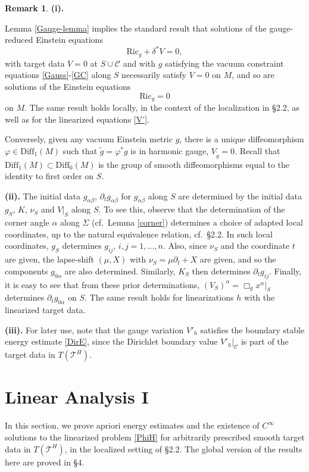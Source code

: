 \documentclass[10pt]{amsart}
\renewcommand{\a}{\alpha}
\renewcommand{\b}{\beta}
\renewcommand{\d}{\delta}
\newcommand{\f}{\varphi}
\newcommand{\Si}{\Sigma}
\newcommand{\cC}{{\mathcal C}}
\newcommand{\cT}{{\mathcal T}}
\newcommand{\Diff}{\mathrm{Diff}}
\newcommand{\Ric}{\mathrm{Ric}}
\newcommand{\p}{\partial}
\newcommand{\<}{\langle}
\renewcommand{\>}{\rangle}
\newcommand{\w}{\widetilde}
\theoremstyle{plain}
\theoremstyle{remark}
\theoremstyle{definition}
\newtheorem{remark}[lemma]{Remark}
\numberwithin{equation}{section}
\begin{document}
\begin{remark} \label{gaugerem} 
{\bf (i).}
{\rm Lemma \ref{Gauge-lemma} implies the standard result that solutions of the gauge-reduced Einstein equations 
$$\Ric_g + \d^*V = 0,$$
with target data $ V = 0$ at $S\cup \cC$ and with $g$ satisfying the vacuum constraint equations \eqref{Gauss}-\eqref{GC} along $S$ necessarily satisfy 
$V = 0$ on $M$, and so are solutions of the Einstein equations 
$$\Ric_g = 0$$
on $M$. The same result holds locally, in the context of the localization in \S 2.2, as well as for the linearized equations \eqref{V'}. 

  Conversely, given any vacuum Einstein metric $g$, there is a unique diffeomorphism $\f \in \Diff_1(M)$ such that $\w g = \f^*g$ is in 
harmonic gauge, $V_{\w g} = 0$. Recall that $\Diff_1(M) \subset \Diff_0(M)$ is the group of smooth diffeomorphisms equal to the identity to 
first order on $S$. 
 
{\bf (ii).} The initial data $g_{\a\b}$, $\p_t g_{\a\b}$ for $g_{\a\b}$ along $S$ are determined by the initial data $g_S$, $K$, $\nu_S$ and $V|_S$ 
along $S$. To see this, observe that the determination of the corner angle $\a$ along $\Si$ (cf.~Lemma \ref{corner}) determines a choice of adapted 
local coordinates, up to the natural equivalence relation, cf.~\S 2.2. In such local coordinates, $g_S$ determines $g_{ij}$, $i, j = 1,\dots, n$. Also, since 
$\nu_S$ and the coordinate $t$ are given, the lapse-shift $(\mu, X)$ with $\nu_S = \mu \p_t + X$ are given, and so the components $g_{0\a}$ are also determined. 
Similarly, $K_S$ then determines $\p_t g_{ij}$. Finally, it is easy to see that from these prior determinations, $(V_S)^{\a} = \Box_g x^{\a}|_S$ determines 
$\p_t g_{0\a}$ on $S$. The same result holds for linearizations $h$ with the linearized target data. 

{\bf (iii).} For later use, note that the gauge variation $V'_h$ satisfies the boundary stable energy estimate \eqref{DirE}, since the Dirichlet boundary 
value $V'_h |_{\cC}$ is part of the target data in $T(\cT^H)$. 

}
\end{remark}
  

  
 \section{Linear Analysis I}
  
  In this section, we prove apriori energy estimates and the existence of $C^{\infty}$ solutions to the linearized problem \eqref{PhiH} for arbitrarily prescribed 
smooth target data in $T(\cT^H)$, in the localized setting of \S 2.2. The global version of the results here are proved in \S 4. 
\end{document}
